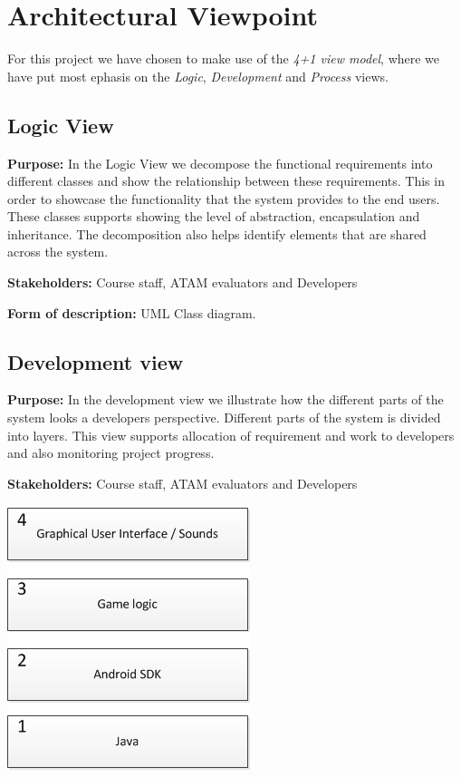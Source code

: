 \chapter{Architectural Viewpoint}
For this project we have chosen to make use of the \emph{4+1 view model}, where we have put most ephasis on the \emph{Logic}, \emph{Development} and \emph{Process} views.

    \section{Logic View}
    \textbf{Purpose:} In the Logic View we decompose the functional requirements into different classes and show the relationship between these requirements. This in order to showcase the functionality that the system provides to the end users.
    These classes supports showing the level of abstraction, encapsulation and inheritance.%
    The decomposition also helps identify elements that are shared across the system. 
    
    \noindent\textbf{Stakeholders:} Course staff, ATAM evaluators and Developers 
    
    \noindent\textbf{Form of description:} UML Class diagram.
    
    \section{Development view}
    \textbf{Purpose:} In the development view we illustrate how the different parts of the system looks a developers perspective. Different parts of the system is divided into layers. This view supports allocation of requirement
    and work to developers and also monitoring project progress.  
    
    \noindent\textbf{Stakeholders:} Course staff, ATAM evaluators and Developers
    

    \includegraphics{DevelopmentView.png}
    
